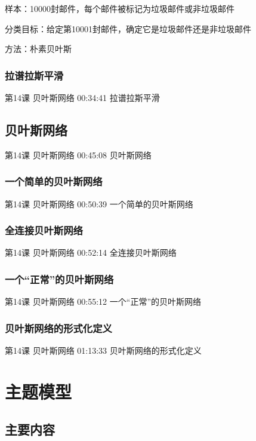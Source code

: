 \documentclass[UTF8]{ctexart}
\begin{document}
样本：10000封邮件，每个邮件被标记为垃圾邮件或非垃圾邮件

分类目标：给定第10001封邮件，确定它是垃圾邮件还是非垃圾邮件

方法：朴素贝叶斯

\subsubsection{拉谱拉斯平滑}

第14课 贝叶斯网络 00:34:41 拉谱拉斯平滑

\subsection{贝叶斯网络}

第14课 贝叶斯网络 00:45:08 贝叶斯网络

\subsubsection{一个简单的贝叶斯网络}

第14课 贝叶斯网络 00:50:39 一个简单的贝叶斯网络

\subsubsection{全连接贝叶斯网络}

第14课 贝叶斯网络 00:52:14 全连接贝叶斯网络

\subsubsection{一个“正常”的贝叶斯网络}

第14课 贝叶斯网络 00:55:12 一个“正常”的贝叶斯网络

\subsubsection{贝叶斯网络的形式化定义}

第14课 贝叶斯网络 01:13:33 贝叶斯网络的形式化定义

\section{主题模型}

\subsection{主要内容}
\end{document}
